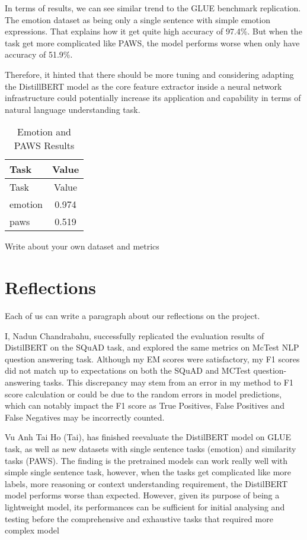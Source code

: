\documentclass[
  11pt,
]{article}
\begin{document}
In terms of results, we can see similar trend to the GLUE benchmark
replication. The emotion dataset as being only a single sentence with
simple emotion expressions. That explains how it get quite high accuracy
of 97.4\%. But when the task get more complicated like PAWS, the model
performs worse when only have accuracy of 51.9\%.

Therefore, it hinted that there should be more tuning and considering
adapting the DistillBERT model as the core feature extractor inside a
neural network infrastructure could potentially increase its application
and capability in terms of natural language understanding task.

\begin{longtable}[]{@{}lc@{}}
\caption{Emotion and PAWS Results}\tabularnewline
\toprule\noalign{}
Task & Value \\
\midrule\noalign{}
\endfirsthead
\toprule\noalign{}
Task & Value \\
\midrule\noalign{}
\endhead
\bottomrule\noalign{}
\endlastfoot
emotion & 0.974 \\
paws & 0.519 \\
\end{longtable}

Write about your own dataset and metrics

\section{Reflections}\label{reflections}

Each of us can write a paragraph about our reflections on the project.

I, Nadun Chandrabahu, successfully replicated the evaluation results of
DistilBERT on the SQuAD task, and explored the same metrics on McTest
NLP question answering task. Although my EM scores were satisfactory, my
F1 scores did not match up to expectations on both the SQuAD and MCTest
question-answering tasks. This discrepancy may stem from an error in my
method to F1 score calculation or could be due to the random errors in
model predictions, which can notably impact the F1 score as True
Positives, False Positives and False Negatives may be incorrectly
counted.

Vu Anh Tai Ho (Tai), has finished reevaluate the DistilBERT model on
GLUE task, as well as new datasets with single sentence tasks (emotion)
and similarity tasks (PAWS). The finding is the pretrained models can
work really well with simple single sentence task, however, when the
tasks get complicated like more labels, more reasoning or context
understanding requirement, the DistilBERT model performs worse than
expected. However, given its purpose of being a lightweight model, its
performances can be sufficient for initial analysing and testing before
the comprehensive and exhaustive tasks that required more complex model
\end{document}
